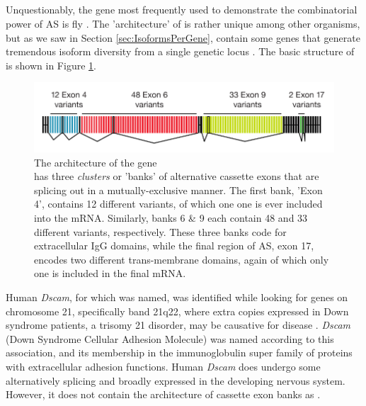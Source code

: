 

\subsection{\flies{} \dscam{}}\label{sec:Dscam}

Unquestionably, the gene most frequently used to demonstrate the combinatorial power of AS is fly \dscam{}. The 'architecture' of \dscam{} is rather unique among other organisms, but as we saw in Section \ref{sec:IsoformsPerGene}, contain some genes that generate tremendous isoform diversity from a single genetic locus \citep{Brown2014}. The basic structure of \dscam{} is shown in Figure \ref{fig:DscamArch}.

\begin{figure}[htbp]
	\centering 
	\includegraphics{Figures/DscamArch.pdf}
	\caption[The architecture of the \flies{} gene \dscam{}]
	{
		The architecture of the \flies{} gene \dscam{}\\[0.25cm]
		\dscam{} has three \textit{clusters} or 'banks' of alternative cassette exons that are splicing out in a mutually-exclusive manner. The first bank, 'Exon 4', contains 12 different variants, of which one one is ever included into the mRNA. Similarly, banks 6 \& 9 each contain 48 and 33 different variants, respectively. These three banks code for extracellular IgG domains, while the final region of AS, exon 17, encodes two different trans-membrane domains, again of which only one is included in the final mRNA.
	}
	\label{fig:DscamArch}
\end{figure}

Human \textit{Dscam}, for which \dscam{} was named, was identified while looking for genes on chromosome 21, specifically band 21q22, where extra copies expressed in Down syndrome patients, a trisomy 21 disorder, may be causative for disease \citep{Yamakawa1998b}. \textit{Dscam} (Down Syndrome Cellular Adhesion Molecule) was named according to this association, and its membership in the immunoglobulin super family of proteins with extracellular adhesion functions. Human \textit{Dscam} does undergo some alternatively splicing and broadly expressed in the developing nervous system. However, it does not contain the architecture of cassette exon banks as \dscam{}.

